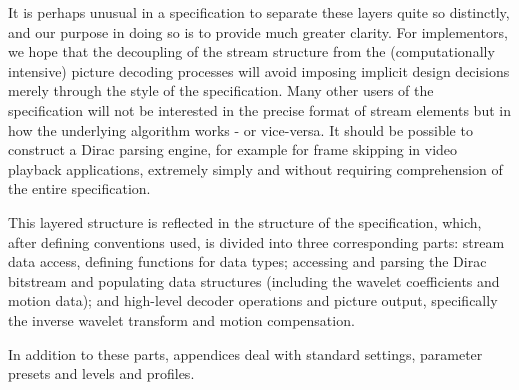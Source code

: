 It is perhaps unusual in a specification to separate these layers quite so distinctly, 
and our purpose in doing so is to provide much greater clarity. For implementors,
we hope that the decoupling of the stream structure from the (computationally intensive)
picture decoding processes will avoid imposing
implicit design decisions merely through the style of the specification. Many
other users of the specification will not be interested in the precise format
of stream elements but in how the underlying algorithm works - or vice-versa.
It should be possible to construct a Dirac parsing engine, for example for
frame skipping in video playback applications, extremely simply and without
requiring comprehension of the entire specification.

This layered structure is reflected in the structure of the specification,
which, after defining conventions used, is divided into three
corresponding parts: stream data access, defining functions for data types; 
accessing and parsing the Dirac bitstream and populating data
structures (including the wavelet coefficients and motion data); and 
high-level decoder operations and picture output, specifically the
inverse wavelet transform and motion compensation.

In addition to these parts, appendices deal with standard settings, parameter
presets and levels and profiles.